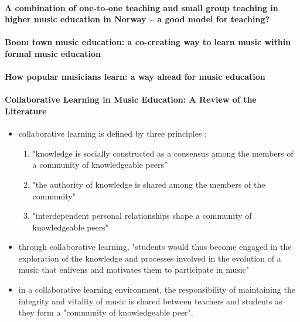 \documentclass[11pt]{article}
\begin{document}
\paragraph{A combination of one-to-one teaching and small group teaching in higher music education in Norway – a good model for teaching?} \citep{bjontegaard_combination_2015}

\paragraph{Boom town music education: a co-creating way to learn music within formal music education} \citep{gullberg_boom_2006}

\paragraph{How popular musicians learn: a way ahead for music education} \citep{green_how_2002}

\paragraph{Collaborative Learning in Music Education: A Review of the Literature} \citep{luce_collaborative_2001}
\begin{itemize}
    \item collaborative learning is defined by three principles :
    \begin{enumerate}
        \item "knowledge is socially constructed as a consensus among the members of a community of knowledgeable peers”
        \item "the authority of knowledge is shared among the members of the community"
        \item "interdependent personal relationships shape a community of knowledgeable peers"
    \end{enumerate}
    \item through collaborative learning, "students would thus become engaged in the exploration of the knowledge and processes involved in the evolution of a music that enlivens and motivates them to participate in music"
    \item in a collaborative learning environment, the responsibility of maintaining the integrity and vitality of music is shared between teachers and students as they form a "community of knowledgeable peer".
\end{itemize}
\end{document}
